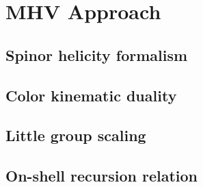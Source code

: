 \chapter{MHV Approach}

\section{Spinor helicity formalism}


\section{Color kinematic duality}


\section{Little group scaling}


\section{On-shell recursion relation}



